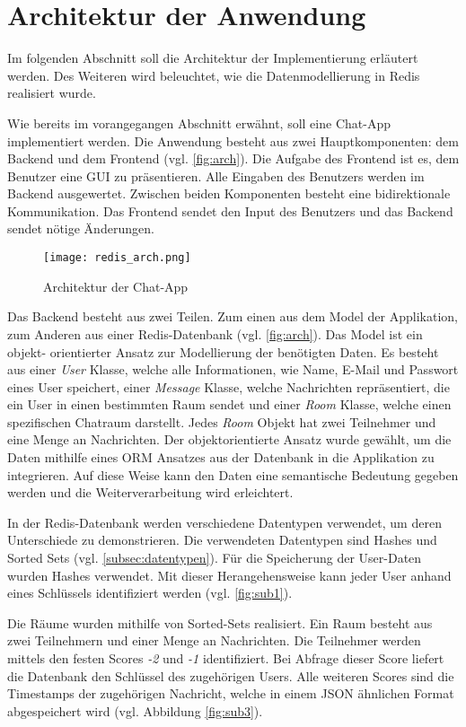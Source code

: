 
\section{Architektur der Anwendung}
Im folgenden Abschnitt soll die Architektur der Implementierung erläutert werden. Des Weiteren wird beleuchtet, wie die Datenmodellierung in \acs{Redis} realisiert wurde.

Wie bereits im vorangegangen Abschnitt erwähnt, soll eine Chat-App implementiert werden. Die Anwendung besteht aus zwei Hauptkomponenten: dem Backend und dem Frontend (vgl. \autoref{fig:arch}). Die Aufgabe des Frontend ist es, dem Benutzer eine \acs{GUI} zu präsentieren. Alle Eingaben des Benutzers werden im Backend ausgewertet. Zwischen beiden Komponenten besteht eine bidirektionale Kommunikation. Das Frontend sendet den Input des Benutzers und das Backend sendet nötige Änderungen.
\begin{figure}[h]
	\centering
	\texttt{[image: redis\_arch.png]}
	\caption{Architektur der Chat-App}
	\label{fig:arch}
\end{figure}

Das Backend besteht aus zwei Teilen. Zum einen aus dem Model der Applikation, zum Anderen aus einer \acs{Redis}-Datenbank (vgl. \autoref{fig:arch}). Das Model ist ein objekt- orientierter Ansatz zur Modellierung der benötigten Daten. Es besteht aus einer \textit{User} Klasse, welche alle Informationen, wie Name, E-Mail und Passwort eines User speichert, einer \textit{Message} Klasse, welche Nachrichten repräsentiert, die ein User in einen bestimmten Raum sendet und einer \textit{Room} Klasse, welche einen spezifischen Chatraum darstellt. Jedes \textit{Room} Objekt hat zwei Teilnehmer und eine Menge an Nachrichten. Der objektorientierte Ansatz wurde gewählt, um die Daten mithilfe eines \acs{ORM} Ansatzes aus der Datenbank in die Applikation zu integrieren. Auf diese Weise kann den Daten eine semantische Bedeutung gegeben werden und die Weiterverarbeitung wird erleichtert.

In der \acs{Redis}-Datenbank werden verschiedene Datentypen verwendet, um deren Unterschiede zu demonstrieren. Die verwendeten Datentypen sind Hashes und Sorted Sets (vgl. \autoref{subsec:datentypen}). Für die Speicherung der User-Daten wurden Hashes verwendet. Mit dieser Herangehensweise kann jeder User anhand eines Schlüssels identifiziert werden (vgl. \autoref{fig:sub1}).

Die Räume wurden mithilfe von Sorted-Sets realisiert. Ein Raum besteht aus zwei Teilnehmern und einer Menge an Nachrichten. Die Teilnehmer werden mittels den festen Scores \textit{-2} und \textit{-1} identifiziert. Bei Abfrage dieser Score liefert die Datenbank den Schlüssel des zugehörigen Users. Alle weiteren Scores sind die Timestamps der zugehörigen Nachricht, welche in einem \acs{JSON} ähnlichen Format abgespeichert wird (vgl. Abbildung \ref{fig:sub3}).

